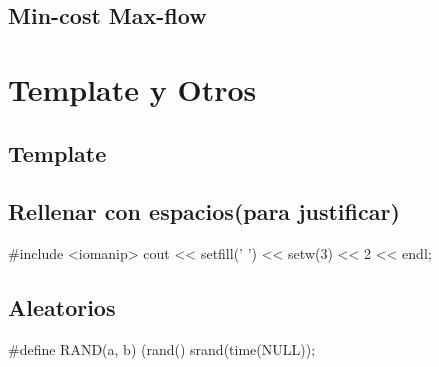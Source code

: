 \subsection{Min-cost Max-flow}

\section{Template y Otros}%
\subsection*{Template}

\subsection*{Rellenar con espacios(para justificar)}
\begin{code}
#include <iomanip>
cout << setfill(' ') << setw(3) << 2 << endl;
\end{code}
\subsection*{Aleatorios}
\begin{code}
#define RAND(a, b) (rand()%
srand(time(NULL));
\end{code}
